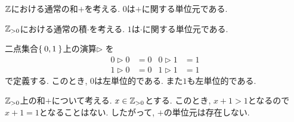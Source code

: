 \begin{example}
  $\mathbb{Z}$における通常の和$+$を考える.
  $0$は$+$に関する単位元である.
\end{example}
\begin{example}
  $\mathbb{Z}_{>0}$における通常の積$\cdot$を考える.
  $1$は$\cdot$に関する単位元である.
\end{example}

\begin{example}
  二点集合$\Set{0,1}$上の演算$\rhd$
  を
  \begin{align*}
    0\rhd 0 &= 0&
    0\rhd 1 &= 1\\
    1\rhd 0 &= 0&
    1\rhd 1 &= 1
  \end{align*}
  で定義する.
  このとき, $0$は左単位的である.
  また$1$も左単位的である.
\end{example}

\begin{nonexample}
  $\mathbb{Z}_{>0}$上の和$+$について考える.
  $x\in\mathbb{Z}_{>0}$とする.
  このとき, 
  $x+1>1$となるので$x+1=1$となることはない.
  したがって, $+$の単位元は存在しない.
\end{nonexample}


